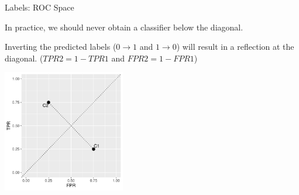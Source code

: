 \documentclass[11pt,compress,t,notes=noshow, xcolor=table]{beamer}
\newenvironment{knitrout}{}{} %
\begin{document}
\begin{vbframe}{Labels: ROC Space}

In practice, we should never obtain a classifier below the diagonal.\\

\lz

Inverting the predicted labels ($0 \rightarrow 1$ and $1 \rightarrow 0$) will result in a reflection at the diagonal. ($TPR2 = 1-TPR1$ and $FPR2 = 1-FPR1$)

\lz




\begin{knitrout}\scriptsize
{}\color{fgcolor}

{\centering \includegraphics[width=0.4\textwidth]{figure/eval_mclass_roc_sp_3} 

}



\end{knitrout}
\end{vbframe}
\end{document}
